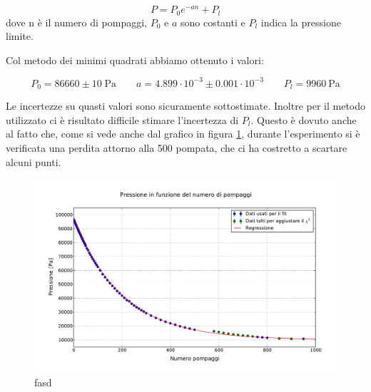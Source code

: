 \begin{equation}
    P = P_0 e^{-an} + P_l
\end{equation}
%
dove n è il numero di pompaggi, $P_0$ e $a$ sono costanti e $P_l$ indica la pressione limite.

Col metodo dei minimi quadrati abbiamo ottenuto i valori:

\begin{equation}
    P_0 = 86660 \pm 10 \; \si{\pascal} \qquad a = 4.899 \cdot 10^{-3} \pm 0.001 \cdot 10^{-3} \qquad P_l = \SI{9960}{\pascal}
\end{equation}

Le incertezze su quasti valori sono sicuramente sottostimate. Inoltre per il metodo utilizzato ci è risultato difficile
stimare l'incertezza di $P_l$. Questo è dovuto anche al fatto che, come si vede anche dal grafico in figura \ref{fig:graph1},
durante l'esperimento si è verificata una perdita attorno alla 500 pompata, che ci ha costretto a scartare alcuni punti.

\begin{figure}
    \includegraphics[width=16cm]{graph.pdf}
    \caption{fasd}
    \label{fig:graph1}
\end{figure}



